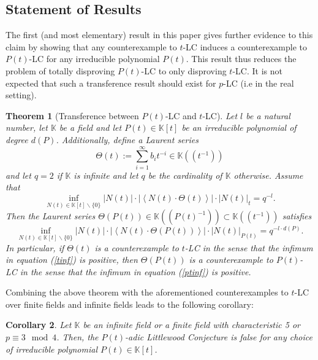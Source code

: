 \documentclass{article}
\newtheorem{theorem}{Theorem}[subsection]
\newtheorem{cor}[theorem]{Corollary}
\theoremstyle{definition}
\newcommand{\K}{\mathbb{K}}
\numberwithin{equation}{subsection}
\begin{document}
\subsection{Statement of Results}
The first (and most elementary) result in this paper gives further evidence to this claim by showing that any counterexample to $t$-LC induces a counterexample to $P(t)$-LC for any irreducible polynomial $P(t)$. This result thus reduces the problem of totally disproving $P(t)$-LC to only disproving $t$-LC. It is not expected that such a transference result should exist for $p$-LC (i.e in the real setting). 
 \begin{theorem}[Transference between $P(t)$-LC and $t$-LC]\label{mainresult}
    Let $l$ be a natural number, let $\K$ be a field and let $P(t)\in{\K}[t]$ be an irreducible polynomial of degree $d(P)$. Additionally, define a Laurent series\begin{equation}\label{CEtheta} \Theta(t):=\sum_{i=1}^\infty b_it^{-i}\in{\K}\left(\!\left(t^{-1}\right)\!\right)\end{equation} and let $q=2$ if $\K$ is infinite and let $q$ be the cardinality of $\K$ otherwise. Assume that\begin{equation}\inf_{N(t)\in{\K}[t]\backslash\{0\}}|N(t)|\cdot \left|\left\langle N(t)\cdot \Theta(t)\right\rangle\right|\cdot |N(t)|_{t}=q^{-l}.\label{tinf}\end{equation} Then the Laurent series $\Theta(P(t))\in{\K}(\!(P(t)^{-1})\!)\subset{\K}\left(\!\left(t^{-1}\right)\!\right)$ satisfies \begin{equation}\label{ptinf}\inf_{N(t)\in{\K}[t]\backslash\{0\}}|N(t)|\cdot \left|\left\langle N(t)\cdot \Theta(P(t))\right\rangle\right|\cdot |N(t)|_{P(t)}=q^{-l\cdot d(P)}.\end{equation} In particular, if $\Theta(t)$ is a counterexample to $t$-LC in the sense that the infimum in equation (\ref{tinf}) is positive, then $\Theta(P(t))$ is a counterexample to $P(t)$-LC in the sense that the infimum in equation (\ref{ptinf}) is positive.
   \end{theorem}
   \noindent Combining the above theorem with the aforementioned counterexamples to $t$-LC over finite fields \cite{Faustin, GaRo, P(t)_LC} and infinite fields \cite{CE} leads to the following corollary: \begin{cor}
       Let ${\K}$ be an infinite field or a finite field with characteristic 5 or $p\equiv 3\mod 4$. Then, the $P(t)$-adic Littlewood Conjecture is false for any choice of irreducible polynomial $P(t)\in{\K}[t]$.
   \end{cor}
 
\end{document}
